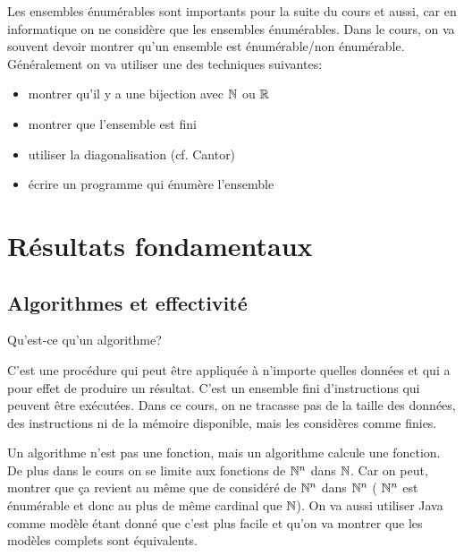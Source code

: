 Les ensembles énumérables sont importants pour la suite du cours et aussi, car en 
informatique on ne considère que les ensembles énumérables.
Dans le cours, on va souvent devoir montrer qu'un ensemble est énumérable/non énumérable.
Généralement on va utiliser une des techniques suivantes: 
\begin{itemize}
	\item montrer qu'il y a une bijection avec $\mathbb{N}$ ou $\mathbb{R}$
	\item montrer que l'ensemble est fini
	\item utiliser la diagonalisation (cf. Cantor)
	\item écrire un programme qui énumère l'ensemble
\end{itemize}


\section{Résultats fondamentaux}
\label{sec:r_sultats_fondamentaux}

\subsection{Algorithmes et effectivité}
\label{sub:algorithmes_et_effectivit_}
Qu'est-ce qu'un algorithme? 

\begin{mydef}[Algorithme]
	C'est une procédure qui peut être appliquée à n'importe
	quelles données et qui a pour effet de produire un résultat. C'est un ensemble fini
	d'instructions qui peuvent être exécutées. Dans ce cours, on ne tracasse pas 
	de la taille des données, des instructions ni de la mémoire disponible, mais 
	les considères comme finies. 
\end{mydef}

\begin{myrem}
	Un algorithme n'est pas une fonction, mais un algorithme calcule une 
	fonction.
	De plus dans le cours on se limite aux fonctions de $\mathbb{N}^n$ dans $\mathbb{N}$. Car on peut,
	montrer que ça revient au même que de considéré de $\mathbb{N}^n$ dans $\mathbb{N}^n$ (
	$\mathbb{N}^n$ est énumérable et donc au plus de même cardinal que $\mathbb{N}$). On va aussi
	utiliser Java comme modèle étant donné que c'est plus facile et qu'on va montrer 
	que les modèles complets sont équivalents.
\end{myrem}


